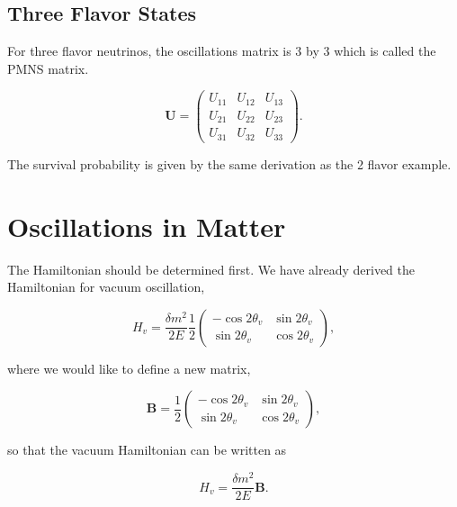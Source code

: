 \documentclass{tufte-handout}
\begin{document}
\subsection{Three Flavor States}

For three flavor neutrinos, the oscillations matrix is 3 by 3 which is called the PMNS matrix.

\begin{equation}
\mathbf U = \begin{pmatrix}
U_{11} & U_{12} & U_{13} \\
U_{21} & U_{22} & U_{23} \\
U_{31} & U_{32} & U_{33}
\end{pmatrix}.
\end{equation}

The survival probability is given by the same derivation as the 2 flavor example.









\section{Oscillations in Matter}


The Hamiltonian should be determined first. We have already derived the Hamiltonian for vacuum oscillation,

\begin{equation*}
H_v=\frac{ \delta m^2 }{2E}\frac{1}{2}\begin{pmatrix} -\cos 2\theta_v & \sin 2 \theta_v \\ \sin 2\theta_v & \cos 2\theta_v  \end{pmatrix},
\end{equation*}


where we would like to define a new matrix,

\begin{equation*}
\mathbf B = \frac{1}{2}\begin{pmatrix}  -\cos 2\theta_v & \sin 2 \theta_v \\ \sin 2\theta_v & \cos 2\theta_v  \end{pmatrix},
\end{equation*}


so that the vacuum Hamiltonian can be written as

\begin{equation*}
H_v = \frac{ \delta m^2 }{2E}\mathbf B.
\end{equation*}
\end{document}
